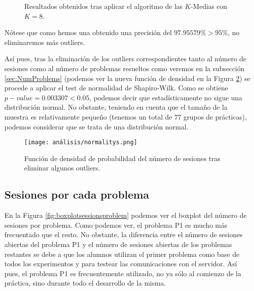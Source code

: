 \begin{figure}[H]
\centering
{}\qquad
{}%
\caption{Resultados obtenidos tras aplicar el algoritmo de las $K$-Medias con $K = 8$.}
\label{fig:KMeans8details}
\end{figure}

Nótese que como hemos una obtenido una precisión del $97.95579\% > 95\%$, no eliminaremos más outliers.

Así pues, tras la eliminación de los outliers correspondientes tanto al número de sesiones como al número de problemas resueltos como veremos en la subsección \ref{sec:NumProblems} (podemos ver la nueva función de densidad en la Figura \ref{fig:normalitys}) se procede a aplicar el test de normalidad de Shapiro-Wilk. Como se obtiene $p-value = 0.003307 < 0.05$, podemos decir que estadísticamente no sigue una distribución normal. No obstante, teniendo en cuenta que el tamaño de la muestra es relativamente pequeño (tenemos un total de $77$ grupos de prácticas), podemos considerar que se trata de una distribución normal.

\begin{figure}[H]
    \centering
    \texttt{[image: análisis/normalitys.png]}
    \caption{Función de densidad de probabilidad del número de sesiones tras eliminar algunos outliers.}
    \label{fig:normalitys}
\end{figure}

\subsection{Sesiones por cada problema}

En la Figura \ref{fig:boxplotsessionsproblem} podemos ver el boxplot del número de sesiones por problema. Como podemos ver, el problema P1 es mucho más frecuentado que el resto. No obstante, la diferencia entre el número de sesiones abiertas del problema P1 y el número de sesiones abiertas de los problemas restantes se debe a que los alumnos utilizan el primer problema como base de todos los experimentos y para testear las comunicaciones con el servidor. Así pues, el problema P1 es frecuentemente utilizado, no ya sólo al comienzo de la práctica, sino durante todo el desarrollo de la misma.

